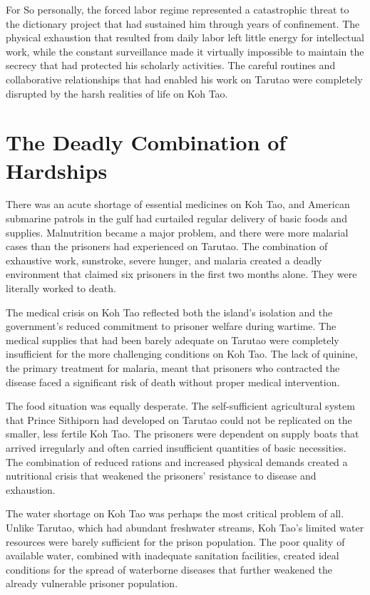 \documentclass[
  Letterpaper,
]{scrbook}
\begin{document}
For So personally, the forced labor regime represented a catastrophic
threat to the dictionary project that had sustained him through years of
confinement. The physical exhaustion that resulted from daily labor left
little energy for intellectual work, while the constant surveillance
made it virtually impossible to maintain the secrecy that had protected
his scholarly activities. The careful routines and collaborative
relationships that had enabled his work on Tarutao were completely
disrupted by the harsh realities of life on Koh Tao.

\section{The Deadly Combination of
Hardships}\label{the-deadly-combination-of-hardships}

There was an acute shortage of essential medicines on Koh Tao, and
American submarine patrols in the gulf had curtailed regular delivery of
basic foods and supplies. Malnutrition became a major problem, and there
were more malarial cases than the prisoners had experienced on Tarutao.
The combination of exhaustive work, sunstroke, severe hunger, and
malaria created a deadly environment that claimed six prisoners in the
first two months alone. They were literally worked to death.

The medical crisis on Koh Tao reflected both the island's isolation and
the government's reduced commitment to prisoner welfare during wartime.
The medical supplies that had been barely adequate on Tarutao were
completely insufficient for the more challenging conditions on Koh Tao.
The lack of quinine, the primary treatment for malaria, meant that
prisoners who contracted the disease faced a significant risk of death
without proper medical intervention.

The food situation was equally desperate. The self-sufficient
agricultural system that Prince Sithiporn had developed on Tarutao could
not be replicated on the smaller, less fertile Koh Tao. The prisoners
were dependent on supply boats that arrived irregularly and often
carried insufficient quantities of basic necessities. The combination of
reduced rations and increased physical demands created a nutritional
crisis that weakened the prisoners' resistance to disease and
exhaustion.

The water shortage on Koh Tao was perhaps the most critical problem of
all. Unlike Tarutao, which had abundant freshwater streams, Koh Tao's
limited water resources were barely sufficient for the prison
population. The poor quality of available water, combined with
inadequate sanitation facilities, created ideal conditions for the
spread of waterborne diseases that further weakened the already
vulnerable prisoner population.
\end{document}
